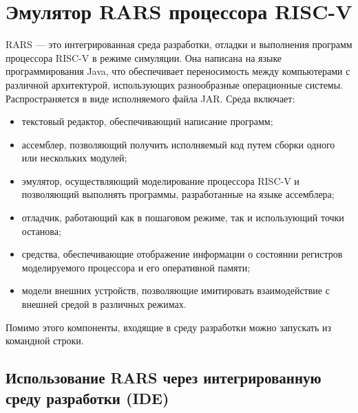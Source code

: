 \chapter{Эмулятор RARS процессора RISC-V}

RARS --- это интегрированная среда разработки, отладки и выполнения программ процессора RISC-V в режиме симуляции. Она написана на языке программирования Java, что обеспечивает переносимость между компьютерами с различной архитектурой, использующих разнообразные операционные системы. Распространяется в виде исполняемого файла JAR. Среда включает:
\begin{itemize}
    \item текстовый редактор, обеспечивающий написание программ;
    \item ассемблер, позволяющий получить исполняемый код путем сборки одного или нескольких модулей;
    \item эмулятор, осуществляющий моделирование процессора RISC-V и позволяющий выполнять программы, разработанные на языке ассемблера;
    \item отладчик, работающий как в пошаговом режиме, так и использующий точки останова;
    \item средства, обеспечивающие отображение информации о состоянии регистров моделируемого процессора и его оперативной памяти;
    \item модели внешних устройств, позволяющие имитировать взаимодействие с внешней средой в различных режимах.
\end{itemize}
Помимо этого компоненты, входящие в среду разработки можно запускать из командной строки.

\section{Использование RARS через интегрированную среду разработки (IDE)}

